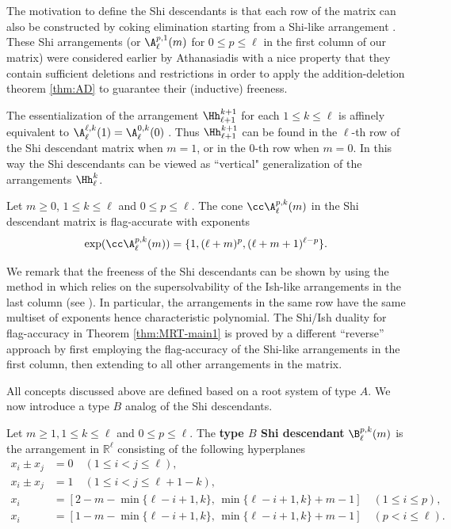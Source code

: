 The motivation to define the Shi descendants is that each row of the matrix can also be constructed by coking elimination starting from a Shi-like arrangement \cite[Proposition 7.16]{MRT24}. 
These Shi arrangements (or $\A^{p,1}_\ell(m)$ for $0 \le p \le \ell$ in the first column of our matrix) were considered earlier by Athanasiadis \cite[Theorem 3.1]{Atha98} with a nice property that they contain sufficient deletions and restrictions  in order to apply the addition-deletion theorem  \ref{thm:AD} to guarantee their (inductive) freeness. 

The essentialization of the arrangement $\Hh_{\ell+1}^{k+1}$ for each $ 1 \leq k \leq \ell $ is affinely equivalent to $\A^{\ell,k}_\ell (1) = \A^{0,k}_\ell (0)$  \cite[Proposition 2.11]{ATT24}. 
Thus $\Hh_{\ell+1}^{k+1}$ can be found in the $\ell$-th row of the Shi descendant  matrix when $m=1$, or in the $0$-th row when $m=0$. 
In this way the Shi descendants can be viewed as ``vertical" generalization of the arrangements $\Hh_{\ell}^{k}$. 
 
 \begin{theorem}
\label{thm:MRT-main1}
Let $m\ge 0$, $1 \le k \le \ell$ and $0 \le p \le \ell$. 
The cone $\cc\A^{p,k}_\ell(m)$ in the Shi descendant matrix is flag-accurate with exponents 
$$\exp(\cc\A^{p,k}_\ell(m)) = \{1, (\ell + m)^{p}, (\ell + m+1)^{\ell-p} \}.$$ 
\end{theorem}

We remark that the freeness of the Shi descendants can be shown by using the method in \cite{ATT24} which relies on the supersolvability of the Ish-like arrangements in the last column (see \cite[Remark 7.19]{MRT24}). 
In particular, the arrangements in the same row have the same multiset of exponents hence characteristic polynomial. 
The Shi/Ish duality for flag-accuracy in Theorem \ref{thm:MRT-main1} is proved by a different ``reverse'' approach by first employing the flag-accuracy of the Shi-like arrangements in the first column, then extending to all other arrangements in the matrix. 

All concepts discussed above are defined based on a root system of type $A$. 
We now introduce a type $B$ analog of the Shi  descendants.
\begin{definition}
\label{def:B-SI}
Let $m\ge 1, 1 \le k \le \ell$ and $0 \le p \le \ell$. 
The   \textbf{type $B$ Shi  descendant} $\B^{p,k}_\ell(m)$ is the arrangement  in $ \mathbb{R}^{\ell} $
consisting of the following hyperplanes
\begin{align*}
x_{i}\pm x_{j} &= 0\quad  (1 \leq i < j \leq \ell), \\
x_{i}\pm x_{j} &= 1 \quad (1 \leq i < j \leq \ell+1-k), \\
x_i&=  [2-m-\min\{\ell-i+1, k\},\,\min\{\ell-i+1, k\}+m-1]  \quad (1 \leq   i \leq p), \\
x_i&=  [1-m-\min\{\ell-i+1, k\},\,\min\{\ell-i+1, k\}+m-1] \quad (p<  i \leq \ell).
\end{align*}
\end{definition}
 


